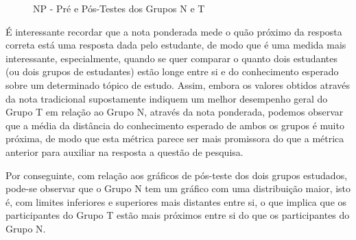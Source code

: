 \begin{figure}[htb]
	\centering
	\captionsetup{justification=centering}
	\caption{NP - Pré e Pós-Testes dos Grupos N e T}
	\label{fig:F1_NP_H02}
\end{figure}

É interessante recordar que a nota ponderada mede o quão próximo da resposta correta está uma resposta dada pelo estudante, de modo que é uma medida mais interessante, especialmente, quando se quer comparar o quanto dois estudantes (ou dois grupos de estudantes) estão longe entre si e do conhecimento esperado sobre um determinado tópico de estudo. Assim, embora os valores obtidos através da nota tradicional supostamente indiquem um melhor desempenho geral do Grupo T em relação ao Grupo N, através da nota ponderada, podemos observar que a média da distância do conhecimento esperado de ambos os grupos é muito próxima, de modo que esta métrica parece ser mais promissora do que a métrica anterior para auxiliar na resposta a questão de pesquisa.

Por conseguinte, com relação aos gráficos de pós-teste dos dois grupos estudados, pode-se observar que o Grupo N tem um gráfico com uma distribuição maior, isto é, com limites inferiores e superiores mais distantes entre si, o que implica que os participantes do Grupo T estão mais próximos entre si do que os participantes do Grupo N.

